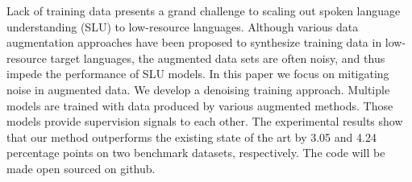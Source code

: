Lack of training data presents a grand challenge to scaling out spoken language understanding (SLU) to low-resource languages. Although various data augmentation approaches have been proposed to synthesize training data in low-resource target languages, the augmented data sets are often noisy, and thus impede the performance of SLU models. In this paper we focus on mitigating noise in augmented data. We develop a denoising training approach. Multiple models are trained with data produced by various augmented methods. Those models provide supervision signals to each other. The experimental results show that our method outperforms the existing state of the art by 3.05 and 4.24 percentage points on two benchmark datasets, respectively. The code will be made open sourced on github.
